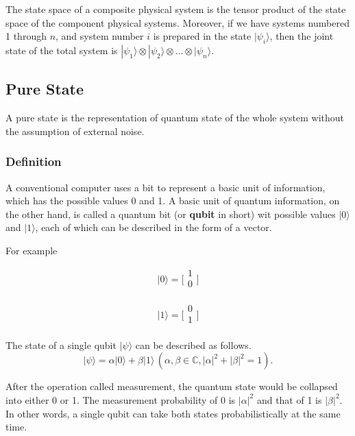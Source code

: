 The state space of a composite physical system is the tensor product of the state space of the component physical systems. 
Moreover, if we have systems numbered 1 through $n$, and system number $i$ is prepared in the state $|\psi_i\rangle$, then the joint state of the total system is $|\psi_1\rangle \otimes |\psi_2\rangle \otimes \dots \otimes |\psi_n\rangle$.


\subsection{Pure State}

A pure state is the representation of quantum state of the whole system without the assumption of external noise.

\subsubsection{Definition}

A conventional computer uses a bit to represent a basic unit of information, which has the possible values 0 and 1. A basic unit of quantum information, on the other hand, is called a quantum bit (or \textbf{qubit} in short) wit possible values $|0\rangle$ and $|1\rangle$, each of which can be described in the form of a vector. 

For example  

\begin{equation}
  |0\rangle = \Big[
    \begin{array}{c}
    1 \\
    0 \\
    \end{array}
    \Big]
\end{equation}

\begin{equation}
  |1\rangle = \Big[
\begin{array}{c}
0 \\
1 \\
\end{array}
\Big]
\end{equation}


The state of a single qubit $|\psi\rangle$ can be described as follows.
\begin{equation}
  |\psi\rangle = \alpha |0\rangle + \beta |1\rangle \,(\alpha, \beta \in \mathbb{C}, |\alpha|^2+|\beta|^2=1).
\end{equation}

 After the operation called measurement, the quantum state would be collapsed into either 0 or 1.  The measurement probability of 0 is $|\alpha|^2$ and that of 1 is $|\beta|^2$. In other words, a single qubit can take both states probabilistically at the same time.  
 
